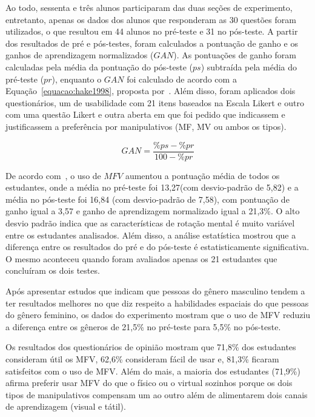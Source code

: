 Ao todo, sessenta e três alunos participaram das duas seções de experimento, entretanto, apenas os dados dos alunos que responderam as 30 questões foram utilizados, o que resultou em 44 alunos no pré-teste e 31 no pós-teste. A partir dos resultados de pré e pós-testes, foram calculados a pontuação de ganho e os ganhos de aprendizagem normalizados ($GAN$). As pontuações de ganho foram calculadas pela média da pontuação do pós-teste ($ps$) subtraída pela média do pré-teste ($pr$), enquanto o $GAN$ foi calculado de acordo com a Equação~\ref{equacao:hake1998}, proposta por~\cite{hake:1998}. Além disso, foram aplicados dois questionários, um de usabilidade com 21 itens baseados na Escala Likert e outro com uma questão Likert e outra aberta em que foi pedido que indicassem e justificassem a preferência por manipulativos (MF, MV ou ambos os tipos).

\begin{equation}\label{equacao:hake1998}
GAN = \frac{\% ps - \% pr}{100 - \% pr}
\end{equation}

De acordo com~\cite{ha:2018}, o uso de $MFV$ aumentou a pontuação média de todos os estudantes, onde a média no pré-teste foi 13,27(com desvio-padrão de 5,82) e a média no pós-teste foi 16,84 (com desvio-padrão de 7,58), com pontuação de ganho igual a 3,57 e ganho de aprendizagem normalizado igual a 21,3\%. O alto desvio padrão indica que as características de rotação mental é muito variável entre os estudantes analisados. Além disso, a análise estatística mostrou que a diferença entre os resultados do pré e do pós-teste é estatisticamente significativa. O mesmo aconteceu quando foram avaliados apenas os 21 estudantes que concluíram os dois testes.

Após apresentar estudos que indicam que pessoas do gênero masculino tendem a ter resultados melhores no que diz respeito a habilidades espaciais do que pessoas do gênero feminino, os dados do experimento mostram que o uso de MFV reduziu a diferença entre os gêneros de 21,5\% no pré-teste para 5,5\% no pós-teste.

Os resultados dos questionários de opinião mostram que 71,8\% dos estudantes consideram útil os MFV, 62,6\% consideram fácil de usar e, 81,3\% ficaram satisfeitos com o uso de MFV. Além do mais, a maioria dos estudantes (71,9\%) afirma preferir usar MFV do que o físico ou o virtual sozinhos porque os dois tipos de manipulativos compensam um ao outro além de alimentarem dois canais de aprendizagem (visual e tátil).

